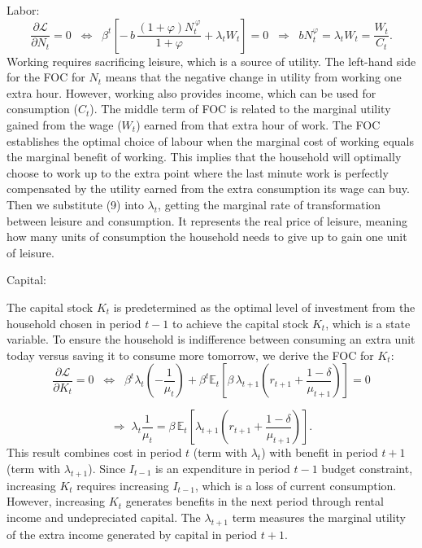 \documentclass[12pt]{article}
\begin{document}
Labor:
\[
\frac{\partial \mathcal{L}}{\partial N_t} = 0 
\;\;\Longleftrightarrow\;\;
\beta^{t} \left[
 -\, b\,\frac{(1+\varphi) N_t^{\,\varphi}}{1+\varphi}
 + \lambda_t W_t
\right] = 0
\;\;\Longrightarrow\;\;
b N_t^{\varphi} = \lambda_t W_t = \frac{W_t}{C_t}.
\tag{10}
\]
Working requires sacrificing leisure, which is a source of utility. The left-hand side for the FOC for $N_t$ means that the negative change in utility from working one extra hour. However, working also provides income, which can be used for consumption ($C_t$). The middle term of FOC is related to the marginal utility gained from the wage ($W_t$) earned from that extra hour of work. The FOC establishes the optimal choice of labour when the marginal cost of working equals the marginal benefit of working. This implies that the household will optimally choose to work up to the extra point where the last minute work is perfectly compensated by the utility earned from the extra consumption its wage can buy. Then we substitute (9) into $\lambda_t$, getting the marginal rate of transformation between leisure and consumption. It represents the real price of leisure, meaning how many units of consumption the household needs to give up to gain one unit of leisure. 

Capital:

The capital stock $K_t$ is predetermined as the optimal level of investment from the household chosen in period $t-1$ to achieve the capital stock $K_t$, which is a state variable. To ensure the household is indifference between consuming an extra unit today versus saving it to consume more tomorrow, we derive the FOC for $K_t$:
\[
\frac{\partial \mathcal{L}}{\partial K_t} = 0 
\;\;\Longleftrightarrow\;\;
\beta^{t}\lambda_t\!\left(-\frac{1}{\mu_t}\right)
+ \beta^{t}\mathbb{E}_t \!\left[
    \beta\, \lambda_{t+1}
    \left( r_{t+1} + \frac{1-\delta}{\mu_{t+1}} \right)
\right] = 0
\]

\[
\Longrightarrow\;
\lambda_t \frac{1}{\mu_t}
=
\beta\, \mathbb{E}_t\!\left[
    \lambda_{t+1}
    \left( r_{t+1} + \frac{1-\delta}{\mu_{t+1}} \right)
\right].
\tag{11}
\]
This result combines cost in period $t$ (term with $\lambda_t$) with benefit in period $t+1$ (term with $\lambda_{t+1}$). Since $I_{t-1}$ is an expenditure in period $t-1$ budget constraint, increasing $K_t$ requires increasing $I_{t-1}$, which is a loss of current consumption. However, increasing $K_t$ generates benefits in the next period through rental income and undepreciated capital. The $\lambda_{t+1}$ term measures the marginal utility of the extra income generated by capital in period $t+1$.
\noindent
\end{document}
